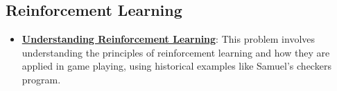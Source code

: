 \documentclass{article}%
\begin{document}
%
\subsection{Reinforcement Learning}%
\label{subsec:ReinforcementLearning}%
\begin{itemize}[leftmargin=*]%
\item \href{https://purdue.brightspace.com/d2l/common/assets/pdfjs-d2l-dist/1.0.14-legacy/web/viewer.html?file=\%2Fcontent\%2Fenforced\%2F1095467-wl.202510.CS.24300.001\%2F02L2-Intro.pdf\%3Fou\%3D1095467\&lang=en-us\&container=d2l-fileviewer-rendered-pdf\&fullscreen=d2l-fileviewer-rendered-pdf-dialog\&height=667#page=46}{\textbf{Understanding Reinforcement Learning}}: This problem involves understanding the principles of reinforcement learning and how they are applied in game playing, using historical examples like Samuel's checkers program.%
\end{itemize}

%
\end{document}
